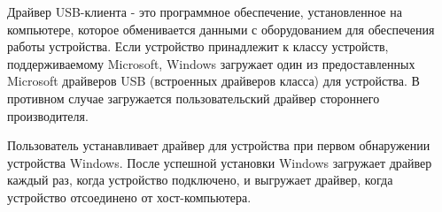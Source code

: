 \documentclass[14pt,a4paper]{article}
\begin{document}
\par Драйвер USB-клиента - это программное обеспечение, установленное на компьютере, которое обменивается данными с оборудованием для обеспечения работы устройства. Если устройство принадлежит к классу устройств, поддерживаемому Microsoft, Windows загружает один из предоставленных Microsoft драйверов USB (встроенных драйверов класса) для устройства. В противном случае загружается пользовательский драйвер стороннего производителя.\\

\par Пользователь устанавливает драйвер для устройства при первом обнаружении устройства Windows. После успешной установки Windows загружает драйвер каждый раз, когда устройство подключено, и выгружает драйвер, когда устройство отсоединено от хост-компьютера.\\
\end{document}
